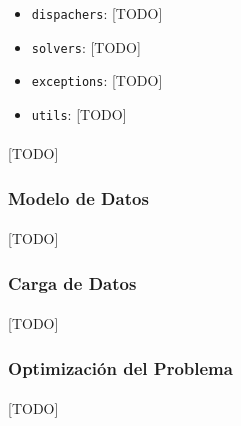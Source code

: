 \documentclass{subfiles}
\begin{document}
          \begin{itemize}
          
            \item \texttt{dispachers}: [TODO]
            
            \item \texttt{solvers}: [TODO]
            
            \item \texttt{exceptions}: [TODO]
            
            \item \texttt{utils}: [TODO]
         
          \end{itemize}

          \paragraph{}
          [TODO]
     
        \subsubsection{Modelo de Datos}
        \label{sec:implementation_components_data_model}

          \paragraph{}
          [TODO]

        \subsubsection{Carga de Datos}
        \label{sec:implementation_components_data_loading}

          \paragraph{}
          [TODO]

        \subsubsection{Optimización del Problema}
        \label{sec:implementation_components_optimization}

          \paragraph{}
          [TODO]
\end{document}
